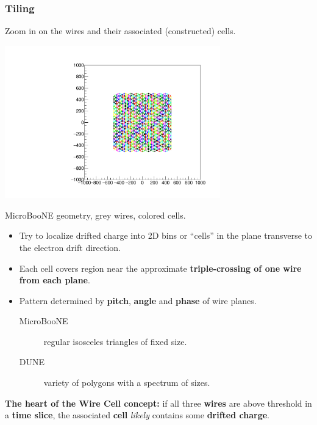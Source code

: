\begin{frame}[fragile]
  \frametitle{Tiling}

  \vspace{-10mm}

  \begin{center}
    \scriptsize Zoom in on the wires and their associated (constructed) cells.

    \includegraphics[width=0.7\textwidth,trim=8.6cm 10cm 8.6cm 9cm,clip]{test_boundcells_uboone.pdf}

    MicroBooNE geometry, grey wires, colored cells.
  \end{center}

  \footnotesize
  \begin{itemize}
  \item Try to localize drifted charge into 2D bins or ``cells'' in
    the plane transverse to the electron drift direction.
  \item Each cell covers region near the approximate
    \textbf{triple-crossing of one wire from each plane}.
  \item Pattern determined by \textbf{pitch}, \textbf{angle} and \textbf{phase} of wire planes.
    \begin{description}
    \item[MicroBooNE] regular isosceles triangles of fixed size.
    \item[DUNE] variety of polygons with a spectrum of sizes.
    \end{description}
  \end{itemize}

  \textbf{The heart of the Wire Cell concept:} if all three
  \textbf{wires} are above threshold in a \textbf{time slice}, the
  associated \textbf{cell} \textit{likely} contains some 
  \textbf{drifted charge}.

\end{frame}

